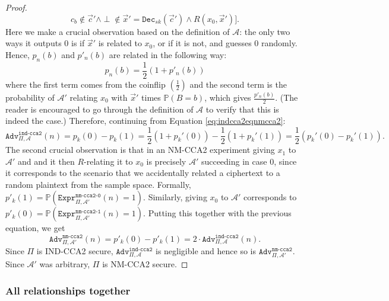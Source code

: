 \documentclass{article}
\theoremstyle{definition}
\theoremstyle{example}
\newcommand{\Dec}{\texttt{Dec}}
\newcommand{\A}{\mathcal{A}}
\newcommand{\Prob}{\mathbb{P}}
\newcommand{\Expr}[2]{\texttt{Expr}^{\texttt{#1}}_{#2}}
\newcommand{\Adv}[2]{\texttt{Adv}^{\texttt{#1}}_{#2}}
\begin{document}
\begin{proof}
\[    c_b \not\in \vec{c}' \land \perp \not\in \vec{x}' = \Dec_{sk}(\vec{c}') \land R(x_0, \vec{x}')].
  \]
  Here we make a crucial observation based on the definition of $\A$: the only
  two ways it outputs $0$ is if $\vec{x}'$ is related to $x_0$, or if it is not,
  and guesses $0$ randomly. Hence, $p_n(b)$ and $p'_n(b)$ are related in the
  following way:
  \[
    p_n(b) = \frac12 (1 + p'_n(b))
  \]
  where the first term comes from the coinflip $(\frac12)$ and the second term
  is the probability of $\A'$ relating $x_0$ with $\vec{x}'$ times $\Prob(B =
  b)$, which gives $\frac{p'_n(b)}{2}$. (The reader is encouraged to go through
  the definition of $\A$ to verify that this is indeed the case.)
  Therefore, continuing from Equation \ref{eq:indcca2eqnmcca2}:
  \[
    \Adv{ind-cca2}{\Pi, \A}(n) = p_k(0) - p_k(1) = \frac12 (1 + p_k'(0)) -
    \frac12 (1 + p_k'(1)) = \frac12 (p_k'(0) - p_k'(1)).
  \]
  The second crucial observation is that in an NM-CCA2 experiment giving $x_1$
  to $\A'$ and and it then $R$-relating it to $x_0$ is precisely $\A'$
  succeeding in case 0, since it corresponds to the scenario that we
  accidentally related a ciphertext to a random plaintext from the sample space.
  Formally, $p'_k(1) = \Prob(\Expr{nm-cca2-0}{\Pi, \A'}(n) = 1)$. Similarly,
  giving $x_0$ to $\A'$ corresponds to $p'_k(0) = \Prob(\Expr{nm-cca2-1}{\Pi, \A'}(n) =
  1)$. Putting this together with the previous equation, we get
  \[
    \Adv{nm-cca2}{\Pi, \A'}(n) = p'_k(0) - p'_k(1) = 2\cdot\Adv{ind-cca2}{\Pi, \A}(n).
  \]
  Since $\Pi$ is IND-CCA2 secure, $\Adv{ind-cca2}{\Pi, \A}$ is negligible and
  hence so is $\Adv{nm-cca2}{\Pi, \A'}$. Since $\A'$ was arbitrary, $\Pi$ is
  NM-CCA2 secure.
\end{proof}
\subsubsection{All relationships together}
\label{sec:allrelations}
\end{document}
